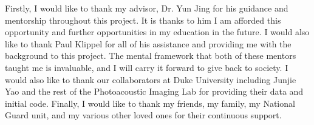 Firstly, I would like to thank my advisor, Dr. Yun Jing for his guidance and mentorship throughout this project. It is thanks to him I am afforded this opportunity and further opportunities in my education in the future. I would also like to thank Paul Klippel for all of his assistance and providing me with the background to this project. The mental framework that both of these mentors taught me is invaluable, and I will carry it forward to give back to society. I would also like to thank our collaborators at Duke University including Junjie Yao and the rest of the Photoacoustic Imaging Lab for providing their data and initial code. Finally, I would like to thank my friends, my family, my National Guard unit, and my various other loved ones for their continuous support.